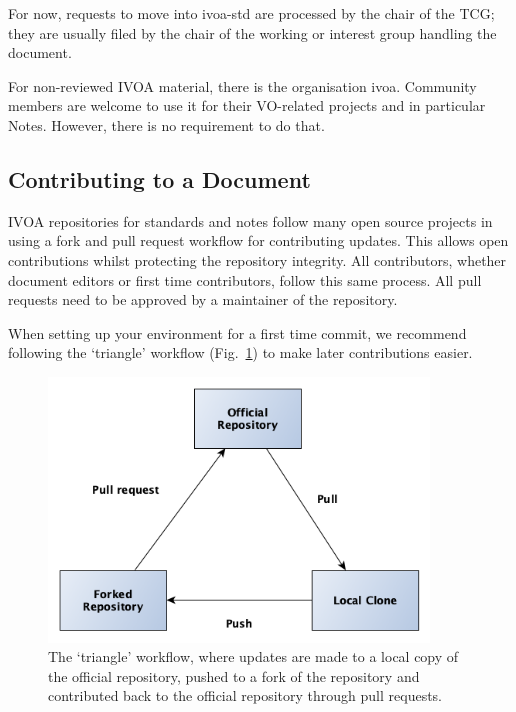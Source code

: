 \documentclass[11pt,a4paper]{ivoa}
\begin{document}
For now, requests to move into ivoa-std are processed by the chair of
the TCG; they are usually filed by the chair of the working or interest
group handling the document.

For non-reviewed IVOA material, there is the organisation ivoa.
Community members are welcome to use it for their VO-related projects
and in particular Notes.  However, there is no requirement to do that.


\subsection{Contributing to a Document}
\label{sect:contributing}

IVOA repositories for standards and notes follow many open source 
projects in using a fork and pull request workflow for contributing 
updates. This allows open contributions whilst protecting the repository
integrity. All contributors, whether document editors or first time 
contributors, follow this same process. All pull requests need to be 
approved by a maintainer of the repository.

When setting up your environment for a first time commit, we recommend
following the `triangle' workflow (Fig.~\ref{fig:triangleWorkflow}) to
make later contributions easier. 

\begin{figure}[th]
  \begin{center}
    \includegraphics[width=0.9\textwidth]{triangle_workflow.png} 
  \end{center}
  \caption{The `triangle' workflow, where updates are made to a local
      copy of the official repository, pushed to a fork of the 
      repository and contributed back to the official repository 
      through pull requests.}
  \label{fig:triangleWorkflow}
\end{figure}
\end{document}
